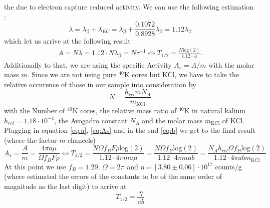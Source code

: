 the due to electron capture reduced activity. We can use the following estimation \cite{ver}:
\begin{equation}
\lambda = \lambda_{\beta} + \lambda_{EC} = \lambda_{\beta} + \frac{0.1072}{0.8928}\lambda_{\beta} = 1.12 \lambda_{\beta}
\label{eq:EC}
\end{equation}
which let us arrive at the following result
\begin{align}
A = N \lambda = 1.12 \cdot N\lambda_\beta= N \tau ^{-1} \Leftrightarrow  T_{1/2} = \frac{N \mathrm{log}(2)}{1.12 \cdot A}.
\label{eq:As}
\end{align}
Additionally to that, we are using the specific Activity $A_s = A / m$ with the molar mass $m$. Since we are not using
pure $^{40}\textrm{K}$ cores but KCl, we have to take the relative occurence of those in our sample into consideration by
\begin{equation}
N = \frac{h_{rel} m N_A}{m_{\mathrm{KCl}}}
\end{equation}
with the Number of $^{40}\textrm{K}$ cores, the relative mass ratio of $^{40}\textrm{K}$ in natural kalium $h_{rel} = 1.18 \cdot 10^{-4}$,
the Avogadro constant $N_A$ and the molar mass $m_{\mathrm{KCl}}$ of KCl.
Plugging in equation \eqref{eq:a}, \eqref{eq:As} and in the end \eqref{eq:b} we get to the final result (where the factor $m$ chancels)
\begin{equation}
A_s = \frac{A}{m} =  \frac{4 \pi a \mu}{\Omega f_B F \rho} \Leftrightarrow T_{1/2} = \frac{N \Omega f_B F \rho \mathrm{log}(2)}{1.12 \cdot 4 \pi m a \mu} 
= \frac{N \Omega f_B \mathrm{log}(2)}{1.12 \cdot 4 \pi m a b} = \frac{N_A h_{rel}\Omega f_B \mathrm{log}(2)}{1.12 \cdot 4 \pi a b m_{\mathrm{KCl}}}
\end{equation}
At this point we use $f_B=1.29$, $\Omega = 2 \pi$ and $\eta = [3.80 \pm 0.06]\cdot 10^{17}$ counts/g (where estimated the errors of the constants to be of the 
same order of magnitude as the last digit) to arrive at
\begin{equation}
T_{1/2} = \frac{\eta}{a b} 
\label{eq:pot_final}
\end{equation}
